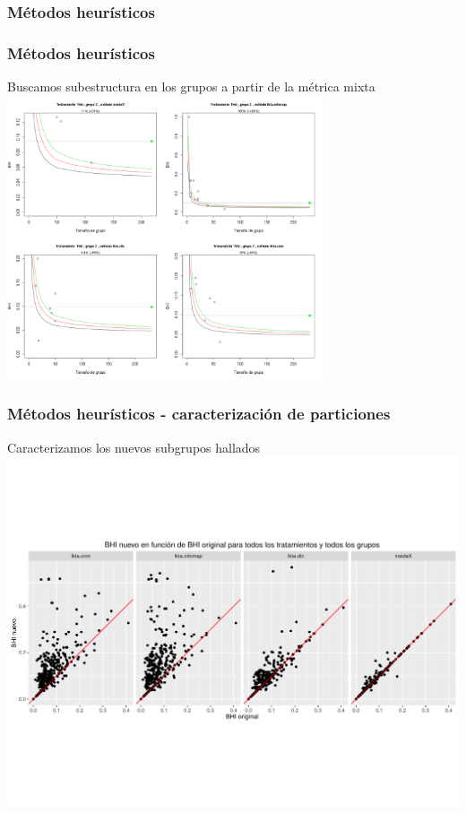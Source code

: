 \documentclass[serif,9pt, t]{beamer}
\begin{document}
\subsubsection*{Métodos heurísticos}

\begin{frame}\frametitle{Métodos heurísticos} 
\centering
Buscamos subestructura en los grupos a partir de la métrica mixta
\centering
\includegraphics[width=0.7\textwidth]{metodos_mixtos_grupo_2.png}
\end{frame}

\begin{frame}\frametitle{Métodos heurísticos - caracterización de particiones} 
\centering
Caracterizamos los nuevos subgrupos hallados
\centering
\includegraphics[width=1\textwidth]{bhi_nuevo_vs_bhi_original.pdf}
\end{frame}
\end{document}
